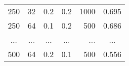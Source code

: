\begin{table}[H]
\begin{tabular}{c|c|c|c|r|c}
    250                                & 32                             & 0.2                         & 0.2                                  & 1000                                & 0.695                  \\
    250                                & 64                             & 0.1                         & 0.2                                  & 500                                 & 0.686                  \\
    ...                                & ...                            & ...                         & ...                                  & ...                                 & ...                    \\
    500                                & 64                             & 0.2                         & 0.1                                  & 500                                 & 0.556                  \\
    \hline               
\end{tabular}
\end{table}